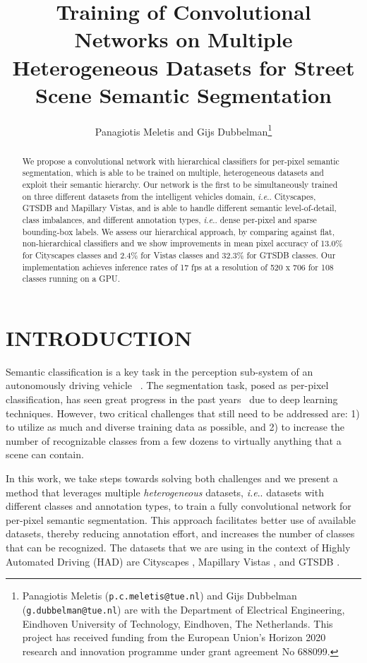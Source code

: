 \documentclass[letterpaper, 10 pt, conference]{ieeeconf}
\title{\LARGE \bf
Training of Convolutional Networks on Multiple Heterogeneous Datasets for Street Scene Semantic Segmentation}
\author{Panagiotis Meletis and Gijs Dubbelman\thanks{Panagiotis Meletis ({\tt\small p.c.meletis@tue.nl}) and Gijs Dubbelman ({\tt\small g.dubbelman@tue.nl}) are with the Department of Electrical Engineering, Eindhoven University of Technology,
        Eindhoven, The Netherlands.
        This project has received funding from the European Union's Horizon 2020 research and innovation programme under grant agreement No 688099.}}
\makeatletter
\DeclareRobustCommand\onedot{\futurelet\@let@token\@onedot}
\def\@onedot{\ifx\@let@token.\else.\null\fi\xspace}
\def\ie{\emph{i.e}\onedot}
\makeatother
\begin{document}
\maketitle
\thispagestyle{empty}
\pagestyle{empty}

\begin{abstract}
We propose a convolutional network with hierarchical classifiers for per-pixel semantic segmentation, which is able to be trained on multiple, heterogeneous datasets and exploit their semantic hierarchy.
Our network is the first to be simultaneously trained on three different datasets from the intelligent vehicles domain, \ie Cityscapes, GTSDB and Mapillary Vistas, and is able to handle different semantic level-of-detail, class imbalances, and different annotation types, \ie dense per-pixel and sparse bounding-box labels.
We assess our hierarchical approach, by comparing against flat, non-hierarchical classifiers and we show improvements in mean pixel accuracy of 13.0\% for Cityscapes classes and 2.4\% for Vistas classes and 32.3\% for GTSDB classes. Our implementation achieves inference rates of 17 fps at a resolution of 520 x 706 for 108 classes running on a GPU.
\end{abstract}


\section{INTRODUCTION}
\label{sec:intro}
Semantic classification is a key task in the perception sub-system of an autonomously driving vehicle ~\cite{janai17computer}. The segmentation task, posed as per-pixel classification, has seen great progress in the past years~\cite{zhao2017survey} due to deep learning techniques. However, two critical challenges that still need to be addressed are: 1) to utilize as much and diverse training data as possible, and 2) to increase the number of recognizable classes from a few dozens to virtually anything that a scene can contain.

In this work, we take steps towards solving both challenges and we present a method that leverages multiple \textit{heterogeneous} datasets, \ie datasets with different classes and annotation types, to train a fully convolutional network for per-pixel semantic segmentation. This approach facilitates better use of available datasets, thereby reducing annotation effort, and increases the number of classes that can be recognized. The datasets that we are using in the context of Highly Automated Driving (HAD) are Cityscapes \cite{c4}, Mapillary Vistas \cite{neuhold2017mapillary}, and GTSDB \cite{houben2013detection}.
\end{document}
